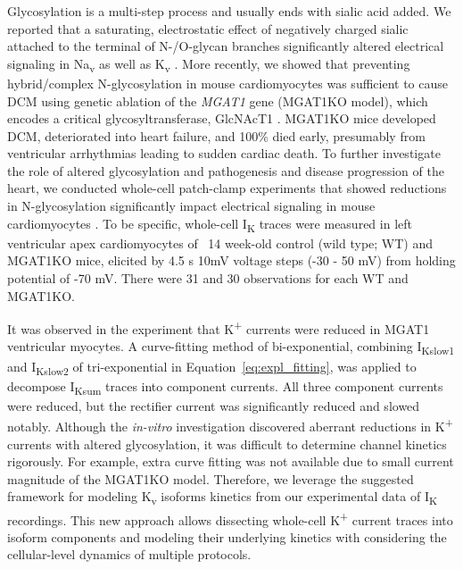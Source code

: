 \documentclass[11pt]{article}
\begin{document}
Glycosylation is a multi-step process and usually ends with sialic acid added. We reported that a saturating, electrostatic effect of negatively charged sialic attached to the terminal of N-/O-glycan branches significantly altered electrical signaling in Na\textsubscript{v} \citep{ednie2013sialicNav1,ednie2015sialicNav2} as well as K\textsubscript{v} \citep{ednie2015sialicKv}. More recently, we showed that preventing hybrid/complex N-glycosylation in mouse cardiomyocytes was sufficient to cause DCM using genetic ablation of the \textit{MGAT1} gene (MGAT1KO model), which encodes a critical glycosyltransferase, GlcNAcT1 \citep{ednie2019reduced2}. MGAT1KO mice developed DCM, deteriorated into heart failure, and 100\% died early, presumably from ventricular arrhythmias leading to sudden cardiac death. To further investigate the role of altered glycosylation and pathogenesis and disease progression of the heart, we conducted whole-cell patch-clamp experiments that showed reductions in N-glycosylation significantly impact electrical signaling in mouse cardiomyocytes \citep{ednie2019reduced}. To be specific, whole-cell I\textsubscript{K} traces were measured in left ventricular apex cardiomyocytes of ~14 week-old control (wild type; WT) and MGAT1KO mice, elicited by 4.5 s 10mV voltage steps (-30 - 50 mV) from holding potential of -70 mV. There were 31 and 30 observations for each WT and MGAT1KO.

It was observed in the experiment that K\textsuperscript{+} currents were reduced in MGAT1 ventricular myocytes. A curve-fitting method of bi-exponential, combining I\textsubscript{Kslow1} and I\textsubscript{Kslow2} of tri-exponential in Equation~\ref{eq:expl_fitting}, was applied to decompose I\textsubscript{Ksum} traces into component currents. All three component currents were reduced, but the rectifier current was significantly reduced and slowed notably. Although the \textit{in-vitro} investigation discovered aberrant reductions in K\textsuperscript{+} currents with altered glycosylation, it was difficult to determine channel kinetics rigorously. For example, extra curve fitting was not available due to small current magnitude of the MGAT1KO model. Therefore, we leverage the suggested framework for modeling K\textsubscript{v} isoforms kinetics from our experimental data of I\textsubscript{K} recordings. This new approach allows dissecting whole-cell K\textsuperscript{+} current traces into isoform components and modeling their underlying kinetics with considering the cellular-level dynamics of multiple protocols.
\end{document}
